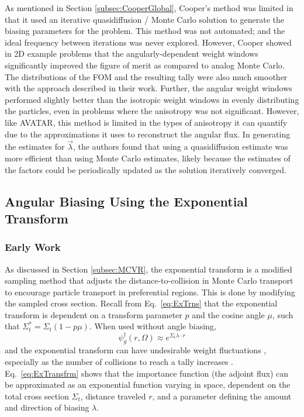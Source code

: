 As mentioned in Section \ref{subsec:CooperGlobal}, Cooper's method was limited in that it used an
iterative quasidiffusion / Monte Carlo solution to generate the biasing parameters for
the problem. This method was not automated; and the ideal frequency between iterations
was never explored. However, Cooper showed in 2D example problems
that the angularly-dependent weight windows
significantly improved the figure of merit as compared to analog Monte Carlo.
The distributions of the FOM and the resulting tally were also much smoother
with the approach described in their work.
Further, the
angular weight windows performed slightly better than the isotropic weight windows in
evenly distributing the particles, even in problems where the anisotropy was not
significant. However, like
AVATAR, this method is limited in the types of anisotropy it can quantify due to
the approximations it uses to reconstruct the angular flux. In generating the
estimates for $\vec{\lambda}$, the authors found that using a quasidiffusion
estimate was more efficient than using Monte Carlo estimates, likely because the
estimates of the factors could be periodically updated as the solution
iteratively converged.
%
%

\subsection{Angular Biasing Using the Exponential Transform}

\subsubsection{Early Work}

As discussed in Section \ref{subsec:MCVR}, the exponential transform is a modified
sampling method that adjusts the distance-to-collision in Monte Carlo
transport to encourage particle transport in preferential regions. This is done
by modifying the sampled cross section.
Recall from Eq.\ \eqref{eq:ExTrns} that
the exponential transform is dependent on a transform parameter $p$ and the
cosine angle $\mu$, such that $\Sigma_t^* = \Sigma_t(1-p\mu)$.
When used without angle biasing,
\begin{equation}
  \psi^{\dagger}_g (r, \Omega) \approx e^{\Sigma_t \lambda \cdot r}
  \label{eq:ExTransfrm}
\end{equation}
and the exponential transform can
have undesirable weight
fluctuations \cite{haghighat_monte_2003}, especially as the number of collisions
to reach a tally increases \cite{gupta_sampling_1985}. Eq.\
\eqref{eq:ExTransfrm} shows that the importance function (the adjoint flux) can
be approximated as an exponential function varying in space, dependent on the
total cross section $\Sigma_t$, distance traveled $r$, and a parameter defining the amount
and direction of biasing $\lambda$.

